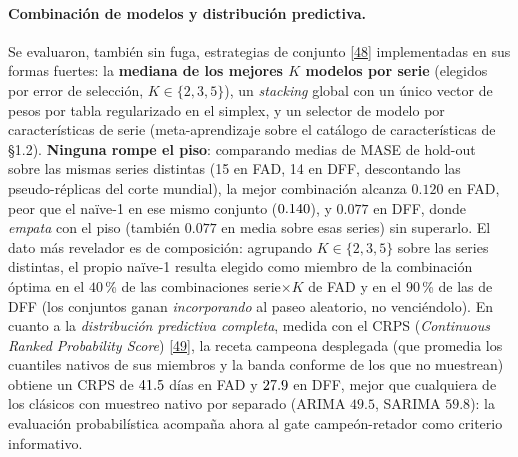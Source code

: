 \documentclass[12pt,letterpaper]{report}
\newcommand{\cita}[1]{\hyperref[bib:#1]{[#1]}}
\begin{document}
\paragraph{Combinación de modelos y distribución predictiva.} Se evaluaron, también sin
fuga, estrategias de conjunto \cita{48} implementadas en sus formas fuertes: la
\textbf{mediana de los mejores $K$ modelos por serie} (elegidos por error de selección,
$K\in\{2,3,5\}$), un \textit{stacking} global con un único vector de pesos por tabla
regularizado en el simplex, y un selector de modelo por características de serie
(meta-aprendizaje sobre el catálogo de características de §1.2). \textbf{Ninguna rompe el
piso}: comparando medias de MASE de hold-out sobre las mismas series distintas (15 en
FAD, 14 en DFF, descontando las pseudo-réplicas del corte mundial), la mejor combinación
alcanza $0.120$ en FAD, peor que el naïve-1 en ese mismo conjunto ($0.140$), y $0.077$
en DFF, donde \textit{empata} con el piso (también $0.077$ en media sobre esas series)
sin superarlo. El dato más revelador es de composición: agrupando $K\in\{2,3,5\}$ sobre
las series distintas, el propio naïve-1 resulta elegido como miembro de la combinación
óptima en el $40$\,\% de las combinaciones serie$\times K$ de FAD y en el $90$\,\% de
las de DFF (los conjuntos ganan \textit{incorporando} al paseo aleatorio,
no venciéndolo). En cuanto a la \textit{distribución predictiva completa}, medida con el
CRPS (\textit{Continuous Ranked Probability Score}) \cita{49}, la receta campeona
desplegada (que promedia los cuantiles nativos de sus miembros y la banda conforme de los
que no muestrean) obtiene un CRPS de $41.5$ días en FAD y $27.9$ en DFF, mejor que
cualquiera de los clásicos con muestreo nativo por separado (ARIMA $49.5$, SARIMA
$59.8$): la evaluación probabilística acompaña ahora al gate campeón-retador como
criterio informativo.
\end{document}
